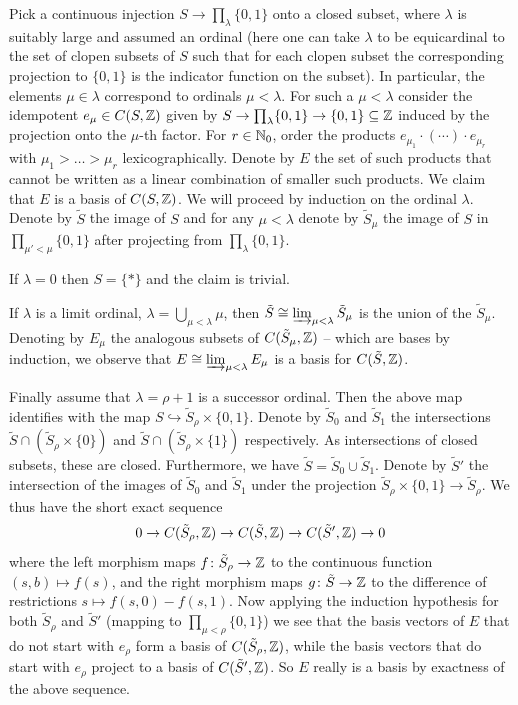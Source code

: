 \begin{proofsketch}
	Pick a continuous injection $S\to \prod_\lambda \{0, 1\}$ onto a closed subset, where $\lambda$ is suitably large and assumed an ordinal (here one can take $\lambda$ to be equicardinal to the set of clopen subsets of $S$ such that for each clopen subset the corresponding projection to $\{0, 1\}$ is the indicator function on the subset). In particular, the elements $\mu \in \lambda$ correspond to ordinals $\mu < \lambda$. For such a $\mu < \lambda$ consider the idempotent $e_\mu \in {C(S, {\mathbb{Z}})}$ given by $S\to\prod_\lambda \{0, 1\}\to \{0, 1\}\subseteq {\mathbb{Z}}$ induced by the projection onto the $\mu$-th factor. For $r\in {\mathbb{N}}_0$, order the products $e_{\mu_1}\cdot (\cdots) \cdot e_{\mu_r}$ with $\mu_1 > \dots > \mu_r$ lexicographically. Denote by $E$ the set of such products that cannot be written as a linear combination of smaller such products. We claim that $E$ is a basis of ${C(S, {\mathbb{Z}})}$. We will proceed by induction on the ordinal $\lambda$. Denote by $\tilde S$ the image of $S$ and for any $\mu <\lambda$ denote by $\tilde S_\mu$ the image of $S$ in $\prod_{\mu'<\mu} \{0, 1\}$ after projecting from $\prod_\lambda \{0, 1\}$. 
	
	If $\lambda = 0$ then $S=\{\ast\}$ and the claim is trivial.
	
	If $\lambda$ is a limit ordinal, \ie $\lambda = \bigcup_{\mu < \lambda} \mu$, then $\tilde S \cong \varinjlim_{\mu < \lambda} \tilde S_\mu$ is the union of the $\tilde S_\mu$. Denoting by $E_\mu$ the analogous subsets of ${C(\tilde S_\mu, {\mathbb{Z}})}$ -- which are bases by induction, we observe that $E \cong \varinjlim_{\mu < \lambda} E_\mu$ is a basis for ${C(\tilde S, {\mathbb{Z}})}$.
	
	Finally assume that $\lambda = \rho + 1$ is a successor ordinal. Then the above map identifies with the map $S \hookrightarrow \tilde S_\rho \times \{0, 1\}$. Denote by $\tilde S_0$ and $\tilde S_1$ the intersections $\tilde S\cap (\tilde S_\rho \times \{0\})$ and $\tilde S\cap (\tilde S_\rho \times \{1\})$ respectively. As intersections of closed subsets, these are closed. Furthermore, we have $\tilde S = \tilde S_0 \cup \tilde S_1$. Denote by $\tilde S'$ the intersection of the images of $\tilde S_0$ and $\tilde S_1$ under the projection $\tilde S_\rho\times\{0, 1\}\to \tilde S_\rho$. We thus have the short exact sequence
		$$0\to {C(\tilde S_\rho, {\mathbb{Z}})}\to {C(\tilde S, {\mathbb{Z}})} \to {C(\tilde S', {\mathbb{Z}})}\to 0$$
	where the left morphism maps $f\colon \tilde S_\rho\to{\mathbb{Z}}$ to the continuous function $(s, b)\mapsto f(s)$, and the right morphism maps $g\colon \tilde S\to {\mathbb{Z}}$ to the difference of restrictions $s\mapsto f(s,0) - f(s, 1)$. Now applying the induction hypothesis for both $\tilde S_\rho$ and $\tilde S'$ (mapping to $\prod_{\mu<\rho} \{0, 1\}$) we see that the basis vectors of $E$ that do not start with $e_\rho$ form a basis of ${C(\tilde S_\rho, {\mathbb{Z}})}$, while the basis vectors that do start with $e_\rho$ project to a basis of ${C(\tilde S', {\mathbb{Z}})}$. So $E$ really is a basis by exactness of the above sequence.
	

\end{proofsketch}
